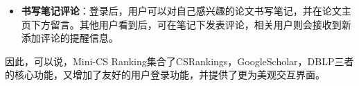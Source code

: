 \begin{itemize}
\item {\bf 书写笔记评论}：登录后，用户可以对自己感兴趣的论文书写笔记，并在论文主页下方留言。其他用户看到后，可在笔记下发表评论，相关用户则会接收到新添加评论的提醒信息。

\begin{figure}[h]
\centering
{}
\end{figure}

\end{itemize}

因此，可以说，Mini-CS Ranking集合了CSRankings，GoogleScholar，DBLP三者的核心功能，又增加了友好的用户登录功能，并提供了更为美观交互界面。


